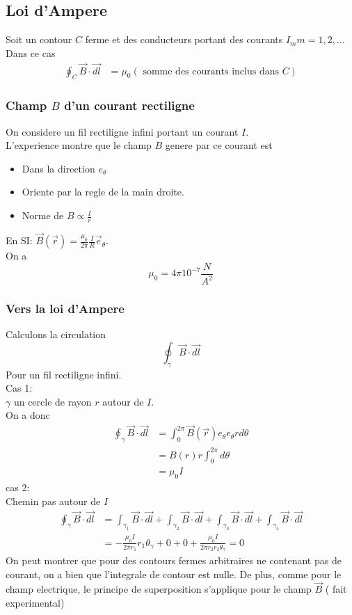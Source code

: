 \documentclass[../main.tex]{subfiles}
\begin{document}
\subsection{Loi d'Ampere}
Soit un contour $C$ ferme et des conducteurs portant des courants $I_{m} m=1,2,\ldots$\\
Dans ce cas
\begin{align*}
	\oint_{C} \vec{B}\cdot \vec{dl} &= \mu_0 ( \text{ somme des courants inclus dans  } C) 
\end{align*}
\subsubsection{Champ $B$ d'un courant rectiligne}
On considere un fil rectiligne infini portant un courant $I$.\\
L'experience montre que le champ $B$ genere par ce courant est
\begin{itemize}
\item Dans la direction $e_{\theta} $ 
\item Oriente par la regle de la main droite.
\item Norme de $B \propto \frac{I}{r}$
\end{itemize}
En SI:  $\vec{B}( \vec{r}) = \frac{\mu_0}{2 \pi}\frac{I}{R}\vec{e}_{\theta} $.\\
On a
\[ 
\mu_0= 4 \pi 10^{-7}\frac{N}{A^{2}}
\]
\subsubsection{Vers la loi d'Ampere}
Calculons la circulation 
\[ 
\oint_{\gamma} \vec{B} \cdot \vec{dl}	
\]
Pour un fil rectiligne infini.\\
Cas 1:\\
$\gamma$ un cercle de rayon $r$ autour de $I$.\\
On a donc
\begin{align*}
	\oint_{\gamma} \vec{B}\cdot \vec{dl} &= \int_{ 0 }^{ 2\pi }\vec{B}( \vec{r}) e_\theta e_{\theta} r d \theta\\
					     &= B( r) r \int_{ 0 }^{ 2\pi } d \theta\\
					     &= \mu_0 I	
\end{align*}
cas 2:\\
Chemin pas autour de $I$ 
\begin{align*}
	\oint_\gamma \vec{B}\cdot \vec{dl} &= \int_{ \gamma_1 }^{  } \vec{B}\cdot \vec{dl} +\int_{ \gamma_2 }^{  } \vec{B}\cdot \vec{dl} +\int_{ \gamma_3 }^{  } \vec{B}\cdot \vec{dl} +\int_{ \gamma_4 }^{  } \vec{B}\cdot \vec{dl} \\
	&= - \frac{\mu_0I}{2\pi r_1} r_1 \theta_\gamma + 0 + 0 + \frac{\mu_0I}{2\pi r_2	r_2 \theta_\gamma}=0
\end{align*}
On peut montrer que pour des contours fermes arbitraires ne contenant pas de courant, on a bien que l'integrale de contour est nulle.
De plus, comme pour le champ electrique, le principe de superposition s'applique pour le champ $\vec{B}$ ( fait experimental)
\end{document}
